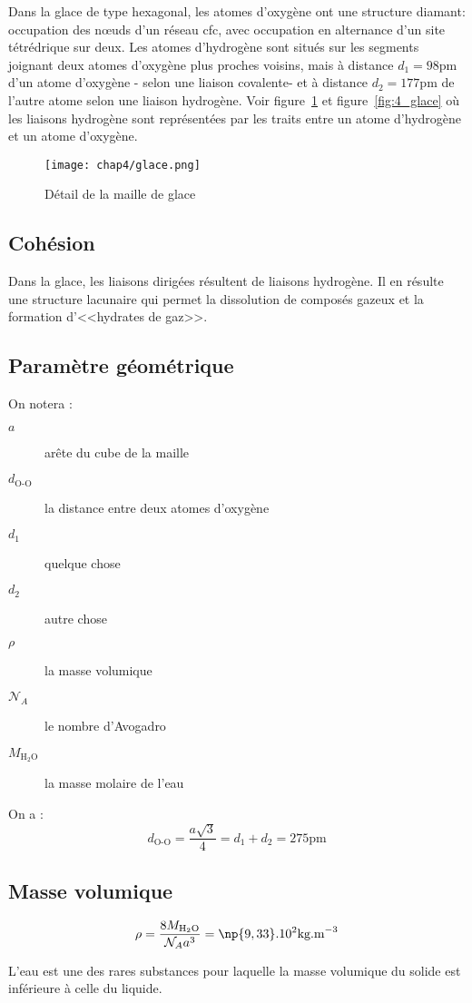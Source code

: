 Dans la glace de type hexagonal, les atomes d’oxygène
ont une structure diamant: occupation des nœuds d’un
réseau cfc, avec occupation en alternance d’un
site tétrédrique sur deux.
Les atomes d’hydrogène sont situés sur les segments
joignant deux atomes d’oxygène plus proches voisins,
mais à distance $d_1=98$pm d’un atome d’oxygène \-- selon
une liaison covalente\-- et à distance $d_2= 177$pm
de l’autre atome selon une liaison hydrogène.
Voir figure~\ref{fig:4_tétraèdre_glace} et
figure~\ref{fig:4_glace} où les liaisons hydrogène sont
représentées par les traits entre un atome d'hydrogène
et un atome d'oxygène.
\begin{figure}
    \centering
    \texttt{[image: chap4/glace.png]}
    \caption{Détail de la maille de glace}
    \label{fig:4_tétraèdre_glace}
\end{figure}

\subsection{Cohésion}
Dans la glace, les liaisons dirigées résultent de liaisons
hydrogène. Il en résulte une structure lacunaire qui permet
la dissolution de composés gazeux et la formation
d’<<hydrates de gaz>>.

\subsection{Paramètre géométrique}
On notera :
\begin{description}
    \item[$a$] arête du cube de la maille
    \item[$d_\text{O-O}$] la distance entre deux atomes
        d'oxygène
    \item[$d_1$] quelque chose
    \item[$d_2$] autre chose
    \item[$\rho$] la masse volumique
    \item[$\mathcal{N}_A$] le nombre d'Avogadro
    \item[$M_{\text{H}_2\text{O}}$] la masse molaire de
        l'eau
\end{description}
On a :
\begin{equation}
    d_\text{O-O} = \frac{a\sqrt{3}}{4} = d_1 + d_2
    = 275\text{pm}
\end{equation}

\subsection{Masse volumique}
\begin{equation}
    \rho = \frac{8M_{\text{H}_2\text{O}}}{\mathcal{N}_A
        a^3} = \np{9,33}.10^2\text{kg.m}^{-3}
\end{equation}
\begin{rem}
    L'eau est une des rares substances pour laquelle la
    masse volumique du solide est inférieure à celle du
    liquide.
\end{rem}

